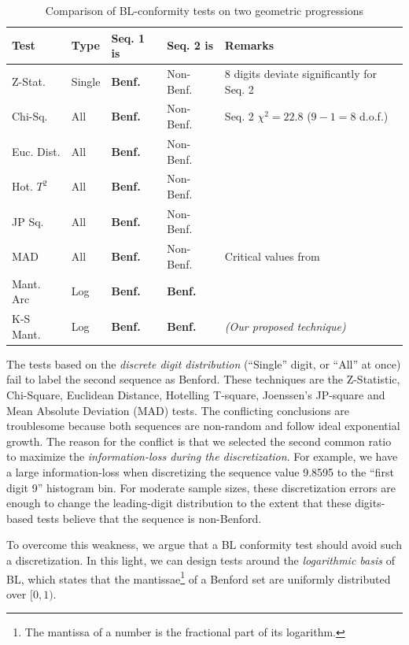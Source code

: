 \documentclass[twoside,leqno,twocolumn]{article}\usepackage[]{graphicx}\usepackage[]{color}
\begin{document}
\begin{table}[h]
  \tiny
  \centering
  \begin{tabular}[h]{|l|l|l|l|p{2.5cm}|}
    \hline
    Test & Type & Seq. 1 is & Seq. 2 is & Remarks \\
    \hline
    Z-Stat. & Single & \textbf{Benf.} & Non-Benf. & 8 digits deviate significantly for Seq. 2  \\    
    Chi-Sq. & All & \textbf{Benf.} & Non-Benf. & Seq. 2 $\chi^2=22.8$ ($9-1=8$ d.o.f.)\\
    Euc. Dist. & All & \textbf{Benf.} & Non-Benf. & \\
    Hot. $T^2$ & All & \textbf{Benf.} & Non-Benf. & \\
    JP Sq. & All & \textbf{Benf.} & Non-Benf. & \\
    MAD & All & \textbf{Benf.} & Non-Benf. & Critical values from \cite{nigrini2012} \\
    Mant. Arc & Log & \textbf{Benf.} & \textbf{Benf.} &  \\
    K-S Mant. & Log & \textbf{Benf.} & \textbf{Benf.} & \textit{(Our proposed technique)}  \\
    \hline
  \end{tabular}
  \caption{Comparison of BL-conformity tests on two geometric progressions}
  \label{tab:bl-conformity-tests}
\end{table}

The tests based on the \textit{discrete digit distribution} (``Single'' digit, or ``All'' at once) fail to label the second sequence as Benford. These techniques are the Z-Statistic, Chi-Square, Euclidean Distance, Hotelling T-square, Joenssen's JP-square and Mean Absolute Deviation (MAD) tests. The conflicting conclusions are troublesome because both sequences are non-random and follow ideal exponential growth. The reason for the conflict is that we selected the second common ratio to maximize the \textit{information-loss during the discretization}. For example, we have a large information-loss when discretizing the sequence value 9.8595 to the ``first digit 9'' histogram bin. For moderate sample sizes, these discretization errors are enough to change the leading-digit distribution to the extent that these digits-based tests believe that the sequence is non-Benford.

To overcome this weakness, we argue that a BL conformity test should avoid such a discretization. In this light, we can design tests around the \textit{logarithmic basis} of BL, which states that the mantissae\footnote{The mantissa of a number is the fractional part of its logarithm.} of a Benford set are uniformly distributed over $[0,1)$.
\end{document}
